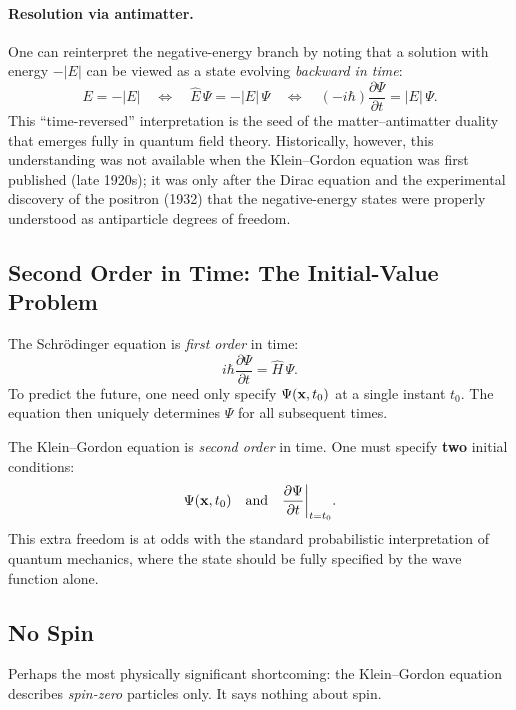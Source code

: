 \documentclass[12pt, a4paper]{article}
\theoremstyle{definition}
\begin{document}
\paragraph{Resolution via antimatter.}
One can reinterpret the negative-energy branch by noting that a solution with
energy $-|E|$ can be viewed as a state evolving \emph{backward in time}:
\begin{equation}
    E = -|E|
    \quad\Longleftrightarrow\quad
    \hat{E}\,\Psi = -|E|\,\Psi
    \quad\Longleftrightarrow\quad
    (-i\hbar)\frac{\partial\Psi}{\partial t} = |E|\,\Psi.
\end{equation}
This ``time-reversed'' interpretation is the seed of the matter--antimatter
duality that emerges fully in quantum field theory.  Historically, however,
this understanding was not available when the Klein--Gordon equation was first
published (late 1920s); it was only after the Dirac equation and the
experimental discovery of the positron (1932) that the negative-energy states
were properly understood as antiparticle degrees of freedom.

\subsection{Second Order in Time: The Initial-Value Problem}

The Schr\"{o}dinger equation is \emph{first order} in time:
\begin{equation}
    i\hbar\frac{\partial\Psi}{\partial t} = \hat{H}\,\Psi.
\end{equation}
To predict the future, one need only specify $\Psi(\vb{x},t_{0})$ at a
single instant $t_{0}$.  The equation then uniquely determines $\Psi$ for all
subsequent times.

The Klein--Gordon equation is \emph{second order} in time.  One must specify
\textbf{two} initial conditions:
\begin{equation}
    \Psi(\vb{x},t_{0})
    \quad\text{and}\quad
    \frac{\partial\Psi}{\partial t}\bigg|_{t=t_{0}}.
\end{equation}
This extra freedom is at odds with the standard probabilistic interpretation
of quantum mechanics, where the state should be fully specified by the wave
function alone.

\subsection{No Spin}

Perhaps the most physically significant shortcoming: the Klein--Gordon
equation describes \emph{spin-zero} particles only.  It says nothing about
spin.
\end{document}
